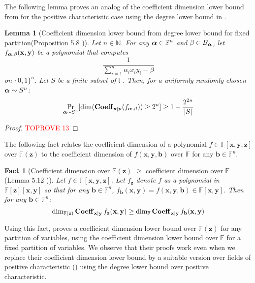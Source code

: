 \documentclass[11pt]{article}
\newtheorem{lemma}[theorem]{Lemma}
\newtheorem{fact}[theorem]{Fact}
\newcommand{\Boo}{\{0,1 \}}
\newcommand{\F}{\mathbb{F}}
\begin{document}
The following lemma proves an analog of the coefficient dimension lower bound from \cite{FSTW21} for the positive characteristic case using the degree lower bound in .

\begin{lemma}[Coefficient dimension lower bound from degree lower bound for fixed partition(Proposition 5.8 \cite{FSTW21})]\label{lem: fixed partition coeff dim lbd}
    Let $n\in \mathbb{N}$. For any $\bfalpha \in \F^n$ and $\beta \in B_{\boldsymbol{\alpha}}$, let $f_{\boldsymbol{\alpha},\beta}(\mathbf{x},\mathbf{y})$ be a polynomial that computes $$\frac{1}{\sum_{i=1}^n \alpha_i x_iy_i - \beta}$$ on $\Boo^n$. Let $S$ be a finite subset of $\F$. Then, for a uniformly randomly chosen $\boldsymbol{\alpha} \sim S^n$: $$ \Pr_{\boldsymbol{\alpha} \sim S^n}[\dim (\operatorname{\mathbf{Coeff}}_{\mathbf{x}|\mathbf{y}}(f_{\boldsymbol{\alpha},\beta})) \geq 2^n] \geq 1-\frac{2^{2n}}{|S|} $$
\end{lemma}

\begin{proof}\textcolor{red}{TOPROVE 13}\end{proof}



The following fact relates the coefficient dimension of a polynomial $f\in \F[\mathbf{x},\mathbf{y},\mathbf{z}]$ over $\F(\mathbf{z})$ to the coefficient dimension of $f(\mathbf{x},\mathbf{y},\mathbf{b})$ over $\F$ for any $\mathbf{b} \in \F^n$.  

\begin{fact}[Coefficient dimension over $\F(\mathbf{z})$ $\geq$ coefficient dimension over $\F$ (Lemma 5.12 \cite{FSTW21})]\label{fact: coeff dim F(z) vs F}
    Let $f\in \F[\mathbf{x},\mathbf{y},\mathbf{z}]$. Let $f_\mathbf{z}$ denote $f$ as a polynomial in $\F[\mathbf{z}][\mathbf{x},\mathbf{y}]$ so that for any $\mathbf{b} \in \F^n$, $f_\mathbf{b}(\mathbf{x},\mathbf{y}) = f(\mathbf{x},\mathbf{y},\mathbf{b}) \in \F[\mathbf{x},\mathbf{y}]$. Then for any $\mathbf{b} \in \F^n$: $$\dim_{\F(\mathbf{z})}\bfCoeff_{\mathbf{x}|\mathbf{y}}f_\mathbf{z}(\mathbf{x},\mathbf{y}) \geq \dim_{\F}\bfCoeff_{\mathbf{x}|\mathbf{y}}f_{\mathbf{\mathbf{b}}}(\mathbf{x},\mathbf{y})$$
\end{fact}
Using this fact, \cite{FSTW21} proves a coefficient dimension lower bound over $\F(\mathbf{z})$ for any partition of variables, using the coefficient dimension lower bound over $\F$ for a fixed partition of variables. We observe that their proofs work even when we replace their coefficient dimension lower bound by a suitable version over fields of positive characteristic () using the degree lower bound over positive characteristic.
\end{document}
